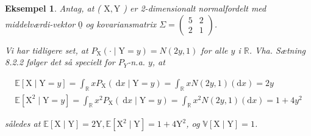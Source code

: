 \documentclass{article}
\newcommand{\1}{\mathbbm{1}}
\theoremstyle{boxed}
\newtheorem{example}[theorem]{Eksempel}
\begin{document}
\begin{example}
    Antag, at ( $\mathrm{X}, \mathrm{Y}$ ) er 2-dimensionalt normalfordelt med middelværdi-vektor $\underline{0}$ og kovariansmatrix $\Sigma=\left(\begin{array}{ll}5 & 2 \\ 2 & 1\end{array}\right)$.

Vi har tidligere set, at $P_{\mathrm{X}}(\cdot \mid \mathrm{Y}=y)=N(2 y, 1)$ for alle $y$ i $\mathbb{R}$.
Vha. Sætning 8.2.2 følger det så specielt for $P_Y$-n.a. $y$, at

$$
\begin{gathered}
\mathbb{E}[\mathrm{X} \mid \mathrm{Y}=y]=\int_{\mathbb{R}} x P_{\mathrm{X}}(\mathrm{~d} x \mid \mathrm{Y}=y)=\int_{\mathbb{R}} x N(2 y, 1)(\mathrm{d} x)=2 y \\
\mathbb{E}\left[\mathrm{X}^2 \mid \mathrm{Y}=y\right]=\int_{\mathbb{R}} x^2 P_{\mathrm{X}}(\mathrm{~d} x \mid \mathrm{Y}=y)=\int_{\mathbb{R}} x^2 N(2 y, 1)(\mathrm{d} x)=1+4 y^2
\end{gathered}
$$

således at $\mathbb{E}[\mathrm{X} \mid \mathrm{Y}]=2 \mathrm{Y}, \mathbb{E}\left[\mathrm{X}^2 \mid \mathrm{Y}\right]=1+4 \mathrm{Y}^2$, og $\mathbb{V}[\mathrm{X} \mid \mathrm{Y}]=1$.
\end{example}
\end{document}
